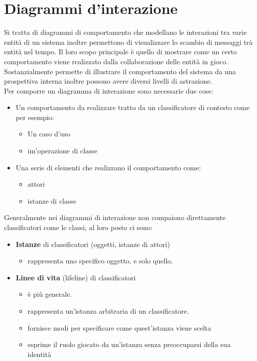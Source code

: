 \documentclass[a4paper, 11pt,oneside]{book}
\begin{document}
\chapter{Diagrammi d'interazione}
    Si tratta di diagrammi di comportamento che modellano le interazioni tra varie entità di un sistema inoltre permettono di visualizzare
    lo scambio di messaggi trà entità nel tempo. Il loro scopo principale è quello di mostrare come un certo comportamento viene realizzato dalla collaborazione
    delle entità in gioco.\\
    Sostanzialmente permette di illustrare il comportamento del sistema da una prospettiva interna inoltre possono avere diversi livelli di astrazione.\\
    Per comporre un diagramma di interazione sono necessarie due cose:
    \begin{itemize}
        \item Un comportamento da realizzare tratto da un classificatore di contesto come per esempio:
        \begin{itemize}
            \item Un caso d'uso
            \item im'operazione di classe
        \end{itemize}
        \item Una serie di elementi che realizzano il comportamento come:
        \begin{itemize}
            \item attori
            \item istanze di classe
        \end{itemize}
    \end{itemize}
    Generalmente nei diagrammi di interazione non compaiono direttamente classificatori come le classi, al loro posto ci sono:
    \begin{itemize}
        \item \textbf{Istanze} di classificatori (oggetti, istanze di attori)
            \begin{itemize}
                \item rappresenta uno specifico oggetto, e solo quello.
            \end{itemize}
        \item \textbf{Linee di vita} (lifeline) di classificatori
            \begin{itemize}
                \item è più generale.
                \item rappresenta un'istanza arbitraria di un classificatore.
                \item fornisce modi per specificare come quest'istanza viene scelta
                \item esprime il ruolo giocato da un'istanza senza preoccuparsi della sua identità
            \end{itemize}
    \end{itemize}
\end{document}

